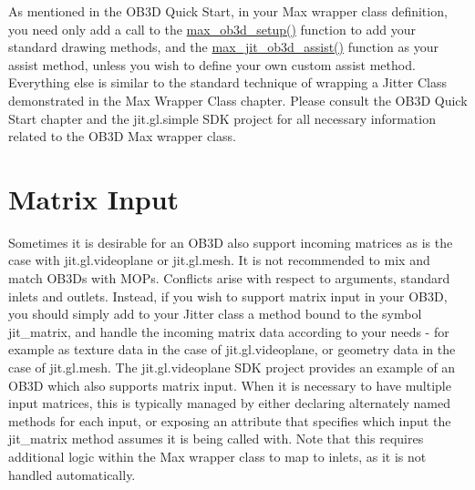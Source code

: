 As mentioned in the OB3D Quick Start, in your Max wrapper class definition, you need only add a call to the \hyperlink{group__ob3dmod_ga6bb6d0a3847efb08150eb752257f8be9}{max\_\-ob3d\_\-setup()} function to add your standard drawing methods, and the \hyperlink{group__ob3dmod_ga8fa7e82f9a1f64c2e5d10b2dbf340536}{max\_\-jit\_\-ob3d\_\-assist()} function as your assist method, unless you wish to define your own custom assist method. Everything else is similar to the standard technique of wrapping a Jitter Class demonstrated in the Max Wrapper Class chapter. Please consult the OB3D Quick Start chapter and the jit.gl.simple SDK project for all necessary information related to the OB3D Max wrapper class.\hypertarget{chapter_jit_ob3ddetails_chapter_jit_ob3ddetails_matin}{}\section{Matrix Input}\label{chapter_jit_ob3ddetails_chapter_jit_ob3ddetails_matin}
Sometimes it is desirable for an OB3D also support incoming matrices as is the case with jit.gl.videoplane or jit.gl.mesh. It is not recommended to mix and match OB3Ds with MOPs. Conflicts arise with respect to arguments, standard inlets and outlets. Instead, if you wish to support matrix input in your OB3D, you should simply add to your Jitter class a method bound to the symbol jit\_\-matrix, and handle the incoming matrix data according to your needs -\/ for example as texture data in the case of jit.gl.videoplane, or geometry data in the case of jit.gl.mesh. The jit.gl.videoplane SDK project provides an example of an OB3D which also supports matrix input. When it is necessary to have multiple input matrices, this is typically managed by either declaring alternately named methods for each input, or exposing an attribute that specifies which input the jit\_\-matrix method assumes it is being called with. Note that this requires additional logic within the Max wrapper class to map to inlets, as it is not handled automatically. 